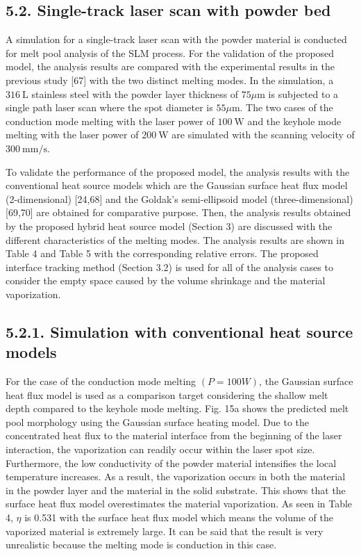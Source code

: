 \documentclass[10pt]{article}
\begin{document}
\subsection*{5.2. Single-track laser scan with powder bed}
A simulation for a single-track laser scan with the powder material is conducted for melt pool analysis of the SLM process. For the validation of the proposed model, the analysis results are compared with the experimental results in the previous study [67] with the two distinct melting modes. In the simulation, a $316 \mathrm{~L}$ stainless steel with the powder layer thickness of $75 \mu \mathrm{m}$ is subjected to a single path laser scan where the spot diameter is $55 \mu \mathrm{m}$. The two cases of the conduction mode melting with the laser power of $100 \mathrm{~W}$ and the keyhole mode melting with the laser power of $200 \mathrm{~W}$ are simulated with the scanning velocity of $300 \mathrm{~mm} / \mathrm{s}$.

To validate the performance of the proposed model, the analysis results with the conventional heat source models which are the Gaussian surface heat flux model (2-dimensional) [24,68] and the Goldak's semi-ellipsoid model (three-dimensional) [69,70] are obtained for comparative purpose. Then, the analysis results obtained by the proposed hybrid heat source model (Section 3) are discussed with the different characteristics of the melting modes. The analysis results are shown in Table 4 and Table 5 with the corresponding relative errors. The proposed interface tracking method (Section 3.2) is used for all of the analysis cases to consider the empty space caused by the volume shrinkage and the material vaporization.

\subsection*{5.2.1. Simulation with conventional heat source models}
For the case of the conduction mode melting $(P=100 W)$, the Gaussian surface heat flux model is used as a comparison target considering the shallow melt depth compared to the keyhole mode melting. Fig. 15a shows the predicted melt pool morphology using the Gaussian surface heating model. Due to the concentrated heat flux to the material interface from the beginning of the laser interaction, the vaporization can readily occur within the laser spot size. Furthermore, the low conductivity of the powder material intensifies the local temperature increases. As a result, the vaporization occurs in both the material in the powder layer and the material in the solid substrate. This shows that the surface heat flux model overestimates the material vaporization. As seen in Table 4, $\eta$ is 0.531 with the surface heat flux model which means the volume of the vaporized material is extremely large. It can be said that the result is very unrealistic because the melting mode is conduction in this case.
\end{document}
